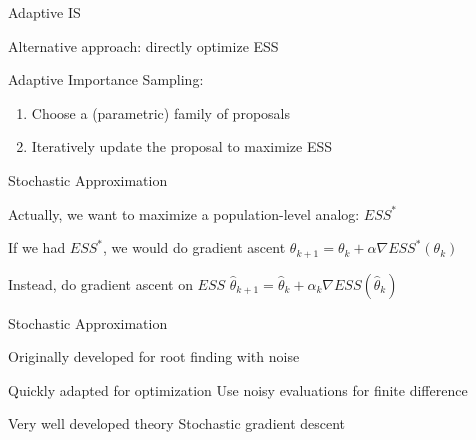 \documentclass[14pt]{beamer}
\begin{document}
\begin{frame}{Adaptive IS}
    \begin{outline}
        \1 Alternative approach: directly optimize ESS \newline

        \1 Adaptive Importance Sampling: 
            \2 \citep{Aky21} \newline
    \end{outline}

    \begin{enumerate}
        [default]
        \item Choose a (parametric) family of proposals
        \item Iteratively update the proposal to maximize ESS
    \end{enumerate}
\end{frame}

\begin{frame}{Stochastic Approximation}
    \begin{outline}
        \1 Actually, we want to maximize a population-level analog: $ESS^*$ \newline

        \1 If we had $ESS^*$, we would do gradient ascent
            \2 $\theta_{k+1} = \theta_k + \alpha \nabla ESS^*(\theta_k)$ \newline

        \1 Instead, do gradient ascent on $ESS$
            \2 $\hat{\theta}_{k+1} = \hat{\theta}_k + \alpha_k \nabla ESS(\hat{\theta}_k)$
    \end{outline}
\end{frame}


\begin{frame}{Stochastic Approximation}
    \begin{outline}
        \1 Originally developed for root finding with noise
            \2 \citep{Rob51} \newline

        \1 Quickly adapted for optimization
            \2 Use noisy evaluations for finite difference
            \2 \citep{Kie52} \newline

        \1 Very well developed theory
        \1 Stochastic gradient descent
    \end{outline}
\end{frame}
\end{document}
